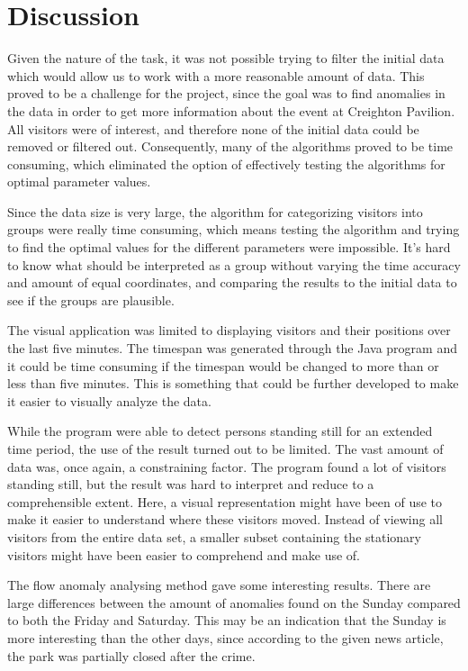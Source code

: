 \documentclass[journal]{vgtc}                %
\begin{document}
\section{Discussion}
Given the nature of the task, it was not possible trying to filter the initial data which would allow us to work with a more reasonable amount of data. This proved to be a challenge for the project, since the goal was to find anomalies in the data in order to get more information about the event at Creighton Pavilion. All visitors were of interest, and therefore none of the initial data could be removed or filtered out. Consequently, many of the algorithms proved to be time consuming, which eliminated the option of effectively testing the algorithms for optimal parameter values.

Since the data size is very large, the algorithm for categorizing visitors into groups were really time consuming, which means testing the algorithm and trying to find the optimal values for the different parameters were impossible. It’s hard to know what should be interpreted as a group without varying the time accuracy and amount of equal coordinates, and comparing the results to the initial data to see if the groups are plausible.

The visual application was limited to displaying visitors and their positions over the last five minutes. The timespan was generated through the Java program and it could be time consuming if the timespan would be changed to more than or less than five minutes. This is something that could be further developed to make it easier to visually analyze the data.

While the program were able to detect persons standing still for an extended time period, the use of the result turned out to be limited. The vast amount of data was, once again, a constraining factor. The program found a lot of visitors standing still, but the result was hard to interpret and reduce to a comprehensible extent. Here, a visual representation might have been of use to make it easier to understand where these visitors moved. Instead of viewing all visitors from the entire data set, a smaller subset containing the stationary visitors might have been easier to comprehend and make use of.

The flow anomaly analysing method gave some interesting results. There are large differences between the amount of anomalies found on the Sunday compared to both the Friday and Saturday. This may be an indication that the Sunday is more interesting than the other days, since according to the given news article, the park was partially closed after the crime.
\end{document}
